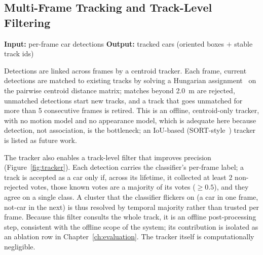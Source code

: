 \subsection{Multi-Frame Tracking and Track-Level Filtering}
\label{sec:pipeline-tracker}

\noindent \textbf{Input:} per-frame car detections \quad \textbar \quad \textbf{Output:} tracked cars (oriented boxes $+$ stable track ids) \vspace{0.5em}

Detections are linked across frames by a centroid tracker. Each frame, current detections are matched to existing
tracks by solving a Hungarian assignment~\cite{kuhn1955hungarian} on the pairwise centroid distance
matrix; matches beyond \SI{2.0}{\meter} are rejected, unmatched detections start
new tracks, and a track that goes unmatched for more than \num{5} consecutive
frames is retired. This is an offline, centroid-only tracker, with no motion model and
no appearance model, which is adequate here because detection, not association, is
the bottleneck; an IoU-based (SORT-style~\cite{bewley2016sort}) tracker is listed as future work.

The tracker also enables a track-level filter that improves precision
(Figure~\ref{fig:tracker}).
Each detection carries the classifier's per-frame label; a track is accepted as a
car only if, across its lifetime, it collected at least \num{2} non-rejected
votes, those known votes are a majority of its votes
($\geq \num{0.5}$), and they agree on a single class. A cluster that the
classifier flickers on (a car in one frame, not-car in the next) is thus
resolved by temporal majority rather than trusted per frame. Because this filter
consults the whole track, it is an offline post-processing step, consistent with
the offline scope of the system; its contribution is isolated as an ablation row
in Chapter~\ref{ch:evaluation}. The tracker itself is computationally negligible.

